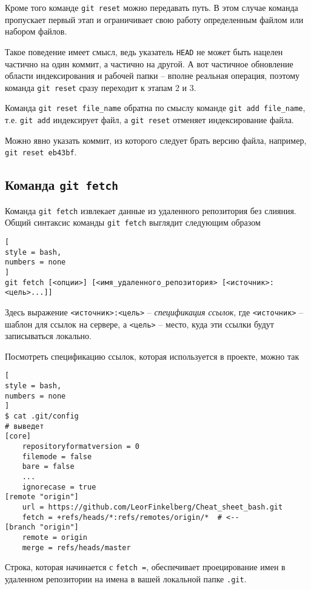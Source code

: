 \documentclass[%
	11pt,
	a4paper,
	utf8,
		]{article}
\begin{document}
Кроме того команде \texttt{git reset} можно передавать путь. В этом случае команда пропускает первый этап и ограничивает свою работу определенным файлом или набором файлов.

Такое поведение имеет смысл, ведь указатель \texttt{HEAD} не может быть нацелен частично на один коммит, а частично на другой. А вот частичное обновление области индексирования и рабочей папки -- вполне реальная операция, поэтому команда \texttt{git reset} сразу переходит к этапам 2 и 3.

Команда \texttt{git reset file\_name} обратна по смыслу команде \texttt{git add file\_name}, т.е. \texttt{git add} индексирует файл, а \texttt{git reset} отменяет индексирование файла.

Можно явно указать коммит, из которого следует брать версию файла, например, \texttt{git reset eb43bf}.

\subsection{Команда \texttt{git fetch}}

Команда \texttt{git fetch} извлекает данные из удаленного репозитория без слияния. Общий синтаксис команды \texttt{git fetch} выглядит следующим образом
\begin{lstlisting}[
style = bash,
numbers = none
]
git fetch [<опции>] [<имя_удаленного_репозитория> [<источник>:<цель>...]]
\end{lstlisting}

Здесь выражение \verb|<источник>:<цель>| -- \emph{спецификация ссылок}, где \verb|<источник>| -- шаблон для ссылок на сервере, а \verb|<цель>| -- место, куда эти ссылки будут записываться локально.

Посмотреть спецификацию ссылок, которая используется в проекте, можно так
\begin{lstlisting}[
style = bash,
numbers = none
]
$ cat .git/config
# выведет
[core]
    repositoryformatversion = 0
    filemode = false
    bare = false
    ...
    ignorecase = true
[remote "origin"]
    url = https://github.com/LeorFinkelberg/Cheat_sheet_bash.git
    fetch = +refs/heads/*:refs/remotes/origin/*  # <--
[branch "origin"]
    remote = origin
    merge = refs/heads/master
\end{lstlisting}

Строка, которая начинается с \texttt{fetch =}, обеспечивает проецирование имен в удаленном репозитории на имена в вашей локальной папке \texttt{.git}.
\end{document}
